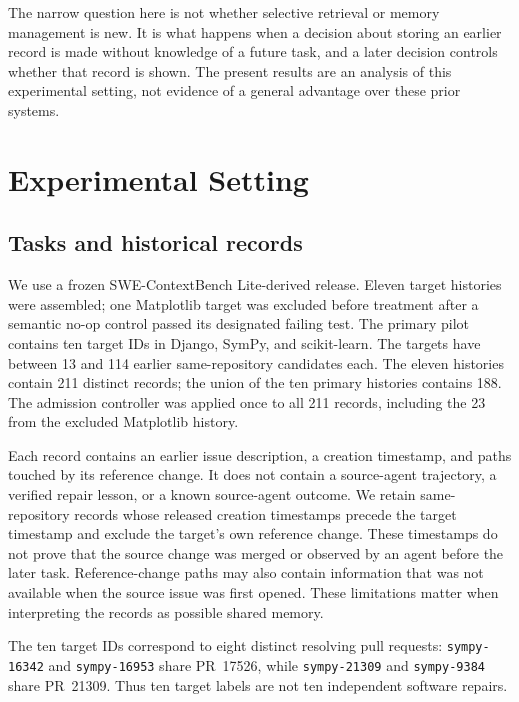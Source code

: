 \documentclass[sigconf,anonymous]{aamas}
\begin{document}
The narrow question here is not whether selective retrieval or memory management is new. It is what happens when a decision about storing an earlier record is made without knowledge of a future task, and a later decision controls whether that record is shown. The present results are an analysis of this experimental setting, not evidence of a general advantage over these prior systems.

\section{Experimental Setting}
\subsection{Tasks and historical records}
We use a frozen SWE-ContextBench Lite-derived release. Eleven target histories were assembled; one Matplotlib target was excluded before treatment after a semantic no-op control passed its designated failing test. The primary pilot contains ten target IDs in Django, SymPy, and scikit-learn. The targets have between 13 and 114 earlier same-repository candidates each. The eleven histories contain 211 distinct records; the union of the ten primary histories contains 188. The admission controller was applied once to all 211 records, including the 23 from the excluded Matplotlib history.

Each record contains an earlier issue description, a creation timestamp, and paths touched by its reference change. It does not contain a source-agent trajectory, a verified repair lesson, or a known source-agent outcome. We retain same-repository records whose released creation timestamps precede the target timestamp and exclude the target's own reference change. These timestamps do not prove that the source change was merged or observed by an agent before the later task. Reference-change paths may also contain information that was not available when the source issue was first opened. These limitations matter when interpreting the records as possible shared memory.

The ten target IDs correspond to eight distinct resolving pull requests: \texttt{sympy-16342} and \texttt{sympy-16953} share PR~17526, while \texttt{sympy-21309} and \texttt{sympy-9384} share PR~21309. Thus ten target labels are not ten independent software repairs.
\end{document}
